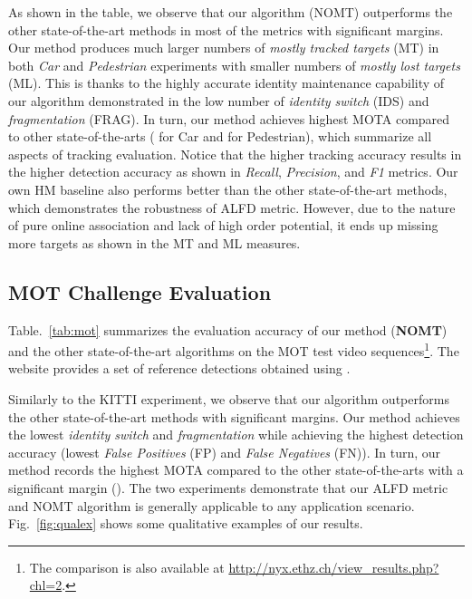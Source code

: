 \documentclass[10pt,twocolumn,letterpaper]{article}
\begin{document}
As shown in the table, we observe that our algorithm (NOMT) outperforms the other state-of-the-art methods in most of the metrics with significant margins. Our method produces much larger numbers of \emph{mostly tracked targets} (MT) in both \emph{Car} and \emph{Pedestrian} experiments with smaller numbers of \emph{mostly lost targets} (ML). This is thanks to the highly accurate identity maintenance capability of our algorithm demonstrated in the low number of \emph{identity switch} (IDS) and \emph{fragmentation} (FRAG). In turn, our method achieves highest MOTA compared to other state-of-the-arts ( for Car and  for Pedestrian), which summarize all aspects of tracking evaluation. Notice that the higher tracking accuracy results in the higher detection accuracy as shown in \emph{Recall}, \emph{Precision}, and \emph{F1} metrics. Our own HM baseline also performs better than the other state-of-the-art methods, which demonstrates the robustness of ALFD metric. However, due to the nature of pure online association and lack of high order potential, it ends up missing more targets as shown in the MT and ML measures.  


\subsection{MOT Challenge Evaluation}

Table.~\ref{tab:mot} summarizes the evaluation accuracy of our method ({\bf NOMT}) and the other state-of-the-art algorithms on the MOT test video sequences\footnote{The comparison is also available at \url{http://nyx.ethz.ch/view_results.php?chl=2}.}. The website provides a set of reference detections obtained using \cite{DollarPAMI14pyramids}.

Similarly to the KITTI experiment, we observe that our algorithm outperforms the other state-of-the-art methods with significant margins. Our method achieves the lowest \emph{identity switch} and \emph{fragmentation} while achieving the highest detection accuracy (lowest \emph{False Positives} (FP) and \emph{False Negatives} (FN)). In turn, our method records the highest MOTA compared to the other state-of-the-arts with a significant margin (). The two experiments demonstrate that our ALFD metric and NOMT algorithm is generally applicable to any application scenario. Fig.~\ref{fig:qualex} shows some qualitative examples of our results.
\end{document}
